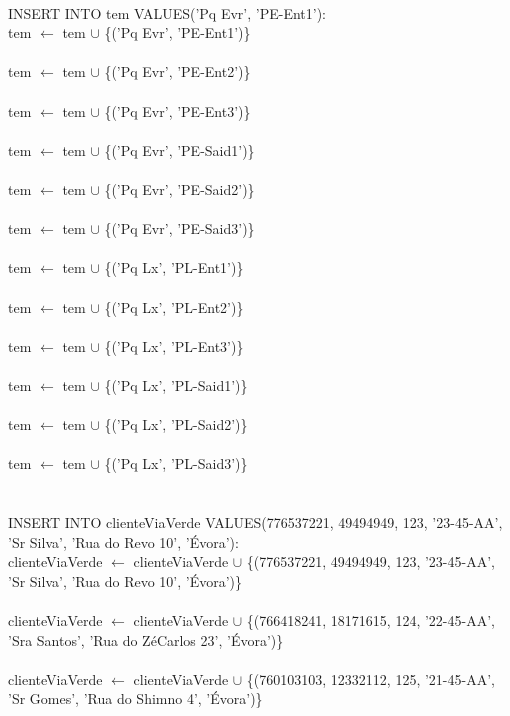 \documentclass[a4paper]{article}
\begin{document}
\\
INSERT INTO tem VALUES('Pq Evr', 'PE-Ent1'):\\
tem $\leftarrow$ tem $\cup$ \{('Pq Evr', 'PE-Ent1')\}\\
\\
tem $\leftarrow$ tem $\cup$ \{('Pq Evr', 'PE-Ent2')\}\\
\\
tem $\leftarrow$ tem $\cup$ \{('Pq Evr', 'PE-Ent3')\}\\
\\
tem $\leftarrow$ tem $\cup$ \{('Pq Evr', 'PE-Said1')\}\\
\\
tem $\leftarrow$ tem $\cup$ \{('Pq Evr', 'PE-Said2')\}\\
\\
tem $\leftarrow$ tem $\cup$ \{('Pq Evr', 'PE-Said3')\}\\
\\
tem $\leftarrow$ tem $\cup$ \{('Pq Lx', 'PL-Ent1')\}\\
\\
tem $\leftarrow$ tem $\cup$ \{('Pq Lx', 'PL-Ent2')\}\\
\\
tem $\leftarrow$ tem $\cup$ \{('Pq Lx', 'PL-Ent3')\}\\
\\
tem $\leftarrow$ tem $\cup$ \{('Pq Lx', 'PL-Said1')\}\\
\\
tem $\leftarrow$ tem $\cup$ \{('Pq Lx', 'PL-Said2')\}\\
\\
tem $\leftarrow$ tem $\cup$ \{('Pq Lx', 'PL-Said3')\}\\
\\
\\
INSERT INTO clienteViaVerde VALUES(776537221, 49494949, 123, '23-45-AA', 'Sr Silva', 'Rua do Revo 10', 'Évora'):\\
clienteViaVerde $\leftarrow$ clienteViaVerde $\cup$ \{(776537221, 49494949, 123, '23-45-AA', 'Sr Silva', 'Rua do Revo 10', 'Évora')\}\\
\\
clienteViaVerde $\leftarrow$ clienteViaVerde $\cup$ \{(766418241, 18171615, 124, '22-45-AA', 'Sra Santos', 'Rua do ZéCarlos 23', 'Évora')\}\\
\\
clienteViaVerde $\leftarrow$ clienteViaVerde $\cup$ \{(760103103, 12332112, 125, '21-45-AA', 'Sr Gomes', 'Rua do Shimno 4', 'Évora')\}\\
\end{document}

